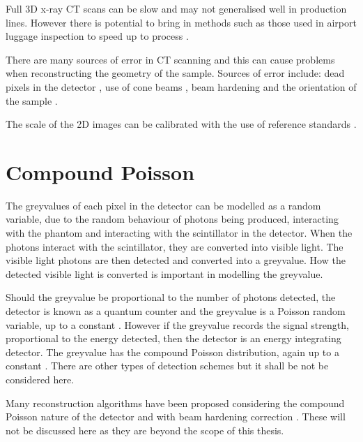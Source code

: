\documentclass[12pt, a4paper]{memoir}
\begin{document}
Full 3D x-ray CT scans can be slow and may not generalised well in production lines. However there is potential to bring in methods such as those used in airport luggage inspection to speed up to process \citep{warnett2016towards}.

There are many sources of error in CT scanning \citep{cantatore2011introduction} and this can cause problems when reconstructing the geometry of the sample. Sources of error include: dead pixels in the detector \citep{brettschneider2014spatial}, use of cone beams \citep{sun2016applications}, beam hardening and the orientation of the sample \citep{corcoran2016observations}.

The scale of the 2D images can be calibrated with the use of reference standards \citep{bartscher2007enhancement} \citep{lifton2013application}.

\section{Compound Poisson}

The greyvalues of each pixel in the detector can be modelled as a random variable, due to the random behaviour of photons being produced, interacting with the phantom and interacting with the scintillator in the detector. When the photons interact with the scintillator, they are converted into visible light. The visible light photons are then detected and converted into a greyvalue. How the detected visible light is converted is important in modelling the greyvalue.

Should the greyvalue be proportional to the number of photons detected, the detector is known as a quantum counter and the greyvalue is a Poisson random variable, up to a constant \citep{whiting2006properties}. However if the greyvalue records the signal strength, proportional to the energy detected, then the detector is an energy integrating detector. The greyvalue has the compound Poisson distribution, again up to a constant \citep{whiting2006properties}. There are other types of detection schemes \citep{whiting2006properties} but it shall be not be considered here.

Many reconstruction algorithms have been proposed considering the compound Poisson nature of the detector \citep{elbakri2002statistical} \citep{elbakri2003statistical} \citep{lasio2007statistical} \citep{xie2008x} and with beam hardening correction \citep{elbakri2003efficient}. These will not be discussed here as they are beyond the scope of this thesis.
\end{document}
